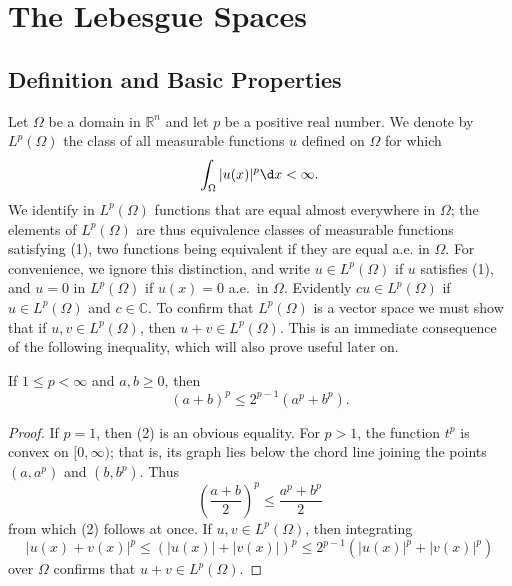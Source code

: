 \chapter[The Lebesgue Spaces $L^p(\Omega)$]%
  {The Lebesgue Spaces }


\section{Definition and Basic Properties}

\begin{para}
  Let $\Omega$ be a domain in $\mathbb{R}^n$ and let $p$ be a positive
  real number. We denote by $L^p(\Omega)$ the class of all measurable
  functions $u$ defined on $\Omega$ for which
  \begin{equation}\label{eq:2.1}
    \int_{\Omega} |u(x)|^p \d x < \infty.
  \end{equation}
  We identify in $L^p(\Omega)$ functions that are equal almost everywhere in $\Omega$;
  the elements of $L^p(\Omega)$ are thus equivalence classes of measurable functions satisfying (1),
  two functions being equivalent if they are equal a.e. in $\Omega$. For convenience,
  we ignore this distinction, and write $u \in L^p(\Omega)$ if $u$ satisfies (1), and $u=0$ in $L^p(\Omega)$
  if $u(x)=0$ a.e.~in $\Omega$. Evidently $c u \in L^p(\Omega)$ if $u \in L^p(\Omega)$ and $c \in \mathbb{C}$. 
  To confirm that $L^p(\Omega)$ is a vector space we must show that if $u, v \in L^p(\Omega)$,
  then $u+v \in L^p(\Omega)$. This is an immediate consequence of the following inequality,
  which will also prove useful later on.
\end{para}


\begin{lemma}
  If $1 \leq p<\infty$ and $a, b \geq 0$, then
  \begin{equation}\label{eq:2.2}
    (a+b)^p \leq 2^{p-1}\left(a^p+b^p\right) .
  \end{equation}
\end{lemma}

\begin{proof}
  If $p=1$, then (2) is an obvious equality. For $p>1$, the function $t^p$ is convex on $[0, \infty)$;
  that is, its graph lies below the chord line joining the points
  $\left(a, a^p\right)$ and $\left(b, b^p\right)$. Thus
  \[
  \left(\frac{a+b}{2}\right)^p \leq \frac{a^p+b^p}{2}
  \]
  from which (2) follows at once.
  If $u, v \in L^p(\Omega)$, then integrating
  \[
  |u(x)+v(x)|^p \leq(|u(x)|+|v(x)|)^p \leq 2^{p-1}\left(|u(x)|^p+|v(x)|^p\right)
  \]
  over $\Omega$ confirms that $u+v \in L^p(\Omega)$.
\end{proof}

